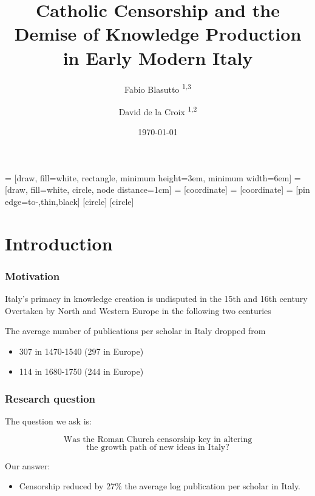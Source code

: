 \documentclass[aspectratio=169,red,12pt]{beamer}
\title{Catholic Censorship and the Demise of Knowledge
	Production in Early Modern Italy}
\author{Fabio Blasutto \textsuperscript{1,3} \and David de la Croix \textsuperscript{1,2}}
\institute[A]{\textsuperscript{1}IRES, UCLouvain\\ \vspace{0.2cm}  %
	\textsuperscript{2}CEPR \\ \vspace{0.2cm} %
	\textsuperscript{3}FNRS}
\begin{document}
	
\date{\today}


	
	 = [draw, fill=white, rectangle, 
	minimum height=3em, minimum width=6em]
	 = [draw, fill=white, circle, node distance=1cm]
	 = [coordinate]
	 = [coordinate]
	 = [pin edge={to-,thin,black}]
	[circle]
	[circle]

	\begin{frame}		
		\maketitle
	\end{frame}
	
	
	
	
	\section{Introduction}



\begin{frame}[label=motivation]
		\frametitle{Motivation}
Italy’s primacy in knowledge creation is undisputed in the 15th and 16th century\\\vspace{0.4cm}
Overtaken by North and Western Europe in the following two centuries\\\vspace{0.4cm}

The average number of publications per scholar in Italy dropped from\\\vspace{0.3cm} 
\begin{itemize}
\item	307 in 1470-1540 (297 in Europe)
\item  114 in 1680-1750 (244 in Europe)
\end{itemize}

\vspace{1cm} 

\hyperlink{graph}{}

\end{frame}
\begin{frame}
\frametitle{Research question}
		
The question we ask is: \vspace{0.3cm}

\[\text{Was the Roman Church censorship key in altering}\] 
\[\text{the growth path of new ideas in Italy?}\]

Our answer: \vspace{0.2cm}

\begin{itemize}
    \item Censorship reduced by 27\% the average log publication per scholar in Italy.
\end{itemize}


\end{frame}
\end{document}
